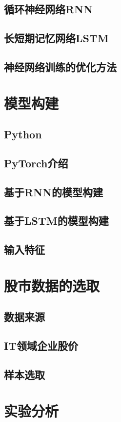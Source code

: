 \documentclass[UTF8]{ctexart}
\begin{document}
\subsection{循环神经网络RNN}
\subsection{长短期记忆网络LSTM}
\subsection{神经网络训练的优化方法}
\section{模型构建}
\subsection{Python}
\subsection{PyTorch介绍}
\subsection{基于RNN的模型构建}
\subsection{基于LSTM的模型构建}
\subsection{输入特征}
\section{股市数据的选取}
\subsection{数据来源}
\subsection{IT领域企业股价}
\subsection{样本选取}
\section{实验分析}
\end{document}
